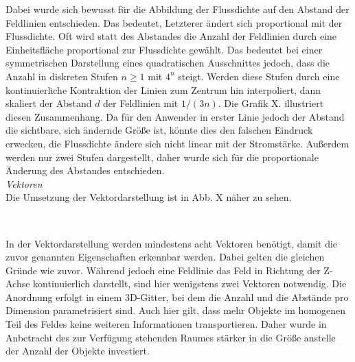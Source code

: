 Dabei wurde sich bewusst für die Abbildung der Flussdichte auf den Abstand der Feldlinien entschieden. Das bedeutet, Letzterer ändert sich proportional mit der Flussdichte. Oft wird statt des Abstandes die Anzahl der Feldlinien durch eine Einheitsfläche proportional zur Flussdichte gewählt. Das bedeutet bei einer symmetrischen Darstellung eines quadratischen Ausschnittes jedoch, dass die Anzahl in diskreten Stufen $n \geq 1$ mit $4^{n}$ steigt. Werden diese Stufen durch eine kontinuierliche Kontraktion der Linien zum Zentrum hin interpoliert, dann skaliert der Abstand $d$ der Feldlinien mit $1/(3n)$. Die Grafik X. illustriert diesen Zusammenhang. Da für den Anwender in erster Linie jedoch der Abstand die sichtbare, sich ändernde Größe ist, könnte dies den falschen Eindruck erwecken, die Flussdichte ändere sich nicht linear mit der Stromstärke. Außerdem werden nur zwei Stufen dargestellt, daher wurde sich für die proportionale Änderung des Abstandes entschieden.\\

\textit{Vektoren}\\
Die Umsetzung der Vektordarstellung ist in Abb. X näher zu sehen.
\vspace{4px}
\begin{center}
	\\
\end{center}
\vspace{6px}
In der Vektordarstellung werden mindestens acht Vektoren benötigt, damit die zuvor genannten Eigenschaften erkennbar werden. Dabei gelten die gleichen Gründe wie zuvor. Während jedoch eine Feldlinie das Feld in Richtung der Z-Achse kontinuierlich darstellt, sind hier wenigstens zwei Vektoren notwendig. Die Anordnung erfolgt in einem 3D-Gitter, bei dem die Anzahl und die Abstände pro Dimension parametrisiert sind. Auch hier gilt, dass mehr Objekte im homogenen Teil des Feldes keine weiteren Informationen transportieren. Daher wurde in Anbetracht des zur Verfügung stehenden Raumes stärker in die Größe anstelle der Anzahl der Objekte investiert.\\


